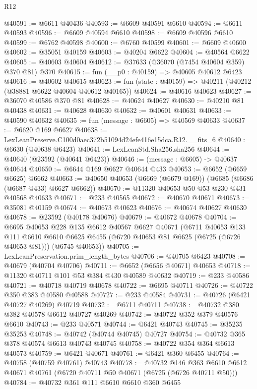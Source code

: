 \begin{lexlean}{R12}
\begin{coremodule}
@40591 := @6611 @40436
@40593 := @6609 @40591 @6610
@40594 := @6611 @40593
@40596 := @6609 @40594 @6610
@40598 := @6609 @40596 @6610
@40599 := @6762 @40598
@40600 := @6760 @40599
@40601 := @6609 @40600
@40602 := @35051 @40159
@40603 := @40204 @6622
@40604 := @40564 @6622
@40605 := @40603 @40604
@40612 := @37633 (@36070 (@7454 @40604 @359) @370 @81) @370
@40615 := fun (__p0 : @40159) => @40605 @40612 @6423
@40616 := @40602 @40615
@40623 := fun (state : @40159) => @40211 (@40212 (@38881 @6622 @40604 @40612 @40165))
@40624 := @40616 @40623
@40627 := @36070 @40586 @370 @81
@40628 := @40624 @40627
@40630 := @40210 @81 @40438
@40631 := @40628 @40630
@40632 := @40601 @40631
@40633 := @40590 @40632
@40635 := fun (message : @6605) => @40569 @40633
@40637 := @6620 @169 @6627
@40638 := LexLeanPreserve.C100d0aec372b51094d24efe416e15dca.R12.__fits_6
@40640 := @6630 (@40638 @6423)
@40641 := LexLeanStd.Sha256.sha256
@40644 := @40640 (@23592 (@40641 @6423))
@40646 := (message : @6605) -> @40637 @40644
@40650 := @6644 @169 @6627 @40644 @433
@40653 := @6652 (@6659 @6625) @6662
@40663 := @40650 @40653 (@6669 (@6679 @169)) (@6685 (@6686 (@6687 @433) @6627 @6662))
@40670 := @11320 @40653 @50 @53 @230 @431 @40568 @40633
@40671 := @233 @40565
@40672 := @40670 @40671
@40673 := @35081 @40159
@40674 := @40673 @40623
@40676 := @40674 @40627 @40630
@40678 := @23592 (@40178 @40676)
@40679 := @40672 @40678
@40704 := @6695
    @40653
    @228
    @135
    @6612
    @40567
    @6627
    @40671
    (@6711
      @40653
      @133
      @111
      @6610
      @6610
      @6625
      @6455
      (@6720 @40653 @81 @6625 (@6725 (@6726 @40653 @81)))
      (@6745 @40653))
@40705 := LexLeanPreservation.prim_length_bytes
@40706 := @40705 @6423
@40708 := @40679 (@40704 @40706)
@40711 := @6652 (@6656 @40671) @40653
@40718 := @11320 @40711 @101 @53 @384 @430 @40589 @40632
@40719 := @233 @40586
@40721 := @40718 @40719 @40678
@40722 := @6695 @40711
@40726 := @40722 @350 @383 @40580 @40588
@40727 := @233 @40584
@40731 := @40726 (@6421 @40727 @40269) @40719
@40732 := @6711 @40711
@40738 := @40732 @380 @382 @40578 @6612 @40727 @40269
@40742 := @40722 @352 @379 @40576 @6610
@40743 := @233 @40571
@40744 := @6421 @40743
@40745 := @35235 @35253
@40748 := @40742 (@40744 @40745) @40727
@40754 := @40732 @365 @378 @40574 @6613 @40743 @40745
@40758 := @40722 @354 @364 @6613 @40573
@40759 := @6421 @40671
@40761 := @6421 @360 @6455
@40764 := @40758 (@40759 @40761) @40743
@40778 := @40732
    @146
    @363
    @6610
    @6612
    @40671
    @40761
    (@6720 @40711 @50 @40671 (@6725 (@6726 @40711 @50)))
@40784 := @40732 @361 @111 @6610 @6610 @360 @6455

\end{coremodule}
\end{lexlean}
